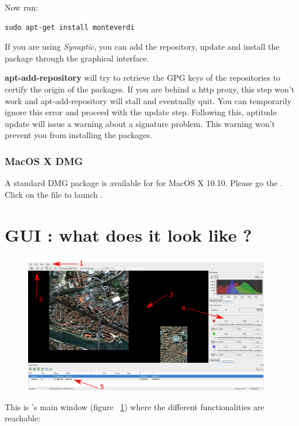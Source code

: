 Now run:
\begin{verbatim}
sudo apt-get install monteverdi
\end{verbatim}

If you are using \emph{Synaptic}, you can add the repository, update and install the package through the
graphical interface.

\textbf{apt-add-repository} will try to retrieve the GPG keys of the
repositories to certify the origin of the packages. If you are behind a http
proxy, this step won't work and apt-add-repository will stall and eventually
quit. You can temporarily ignore this error and proceed with the update
step. Following this, aptitude update will issue a warning about a signature
problem. This warning won't prevent you from installing the packages.

\subsubsection{MacOS X DMG}
A standard DMG package is available for \mont for MacOS X 10.10. Please go the \download.
Click on the file to launch \mont.

\section{GUI : what does it look like ?}\label{sec:mongui}

\begin{figure}[!h] 
  \center
  \includegraphics[width=0.95\textwidth]{../Art/MonteverdiImages/gui.png}
  \label{fig:mongui}
\end{figure}

This is \mont's main window (figure ~\ref{fig:mongui}) where the
different functionalities are reachable:

